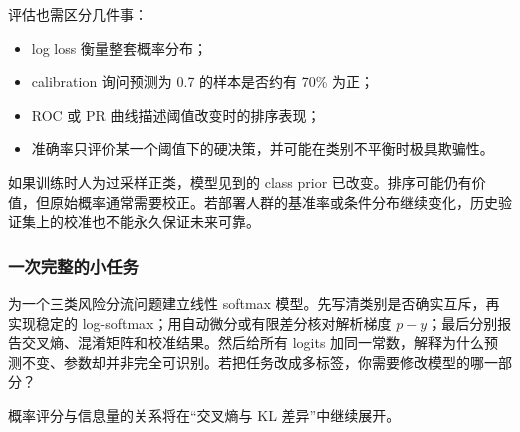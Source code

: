 评估也需区分几件事：

\begin{itemize}
\tightlist
\item
  log loss 衡量整套概率分布；
\item
  calibration 询问预测为 0.7 的样本是否约有 70\% 为正；
\item
  ROC 或 PR 曲线描述阈值改变时的排序表现；
\item
  准确率只评价某一个阈值下的硬决策，并可能在类别不平衡时极具欺骗性。
\end{itemize}

如果训练时人为过采样正类，模型见到的 class prior 已改变。排序可能仍有价值，但原始概率通常需要校正。若部署人群的基准率或条件分布继续变化，历史验证集上的校准也不能永久保证未来可靠。

\subsubsection{一次完整的小任务}

为一个三类风险分流问题建立线性 softmax 模型。先写清类别是否确实互斥，再实现稳定的 log-softmax；用自动微分或有限差分核对解析梯度 \(p-y\)；最后分别报告交叉熵、混淆矩阵和校准结果。然后给所有 logits 加同一常数，解释为什么预测不变、参数却并非完全可识别。若把任务改成多标签，你需要修改模型的哪一部分？

概率评分与信息量的关系将在``交叉熵与 KL 差异''中继续展开。
